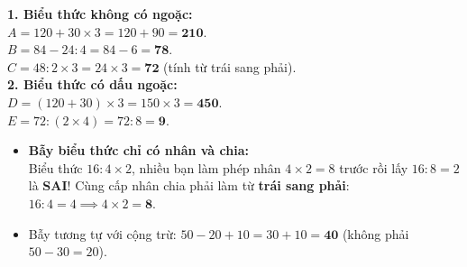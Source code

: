 \documentclass[11pt,a4paper]{article}
\begin{document}
\vspace{-2.5mm}
\noindent
\begin{minipage}[t]{0.49\textwidth}\vspace{0pt}
\begin{tcolorbox}[
  enhanced,
  colback=green!4!white,
  colframe=green!60!black,
  arc=2mm, boxrule=0.8pt,
  left=2mm, right=2mm, top=1.8mm, bottom=1.8mm,
  title={\footnotesize\bfseries\color{white}\faCheckCircle\ Ví dụ thực hành chuẩn mực}
]
{\footnotesize
\textbf{1. Biểu thức không có ngoặc:}\\
$A = 120 + 30 \times 3 = 120 + 90 = \mathbf{210}$.\\
$B = 84 - 24 : 4 = 84 - 6 = \mathbf{78}$.\\
$C = 48 : 2 \times 3 = 24 \times 3 = \mathbf{72}$ (tính từ trái sang phải).\\
\textbf{2. Biểu thức có dấu ngoặc:}\\
$D = (120 + 30) \times 3 = 150 \times 3 = \mathbf{450}$.\\
$E = 72 : (2 \times 4) = 72 : 8 = \mathbf{9}$.
}
\end{tcolorbox}
\end{minipage}
\hfill
\begin{minipage}[t]{0.49\textwidth}\vspace{0pt}
\begin{tcolorbox}[
  enhanced,
  colback=red!4!white,
  colframe=red!70!black,
  arc=2mm, boxrule=0.8pt,
  left=2mm, right=2mm, top=1.8mm, bottom=1.8mm,
  title={\footnotesize\bfseries\color{white}\faExclamationTriangle\ Mẹo tránh bẫy trắc nghiệm}
]
{\footnotesize
\begin{itemize}\setlength{\itemsep}{1.5pt}\setlength{\leftskip}{-2.5mm}
  \item \textbf{Bẫy biểu thức chỉ có nhân và chia:}\\
  Biểu thức $16 : 4 \times 2$, nhiều bạn làm phép nhân $4 \times 2 = 8$ trước rồi lấy $16 : 8 = 2$ là \textbf{SAI}! Cùng cấp nhân chia phải làm từ \textbf{trái sang phải}: $16 : 4 = 4 \implies 4 \times 2 = \mathbf{8}$.
  \item Bẫy tương tự với cộng trừ: $50 - 20 + 10 = 30 + 10 = \mathbf{40}$ (không phải $50 - 30 = 20$).
\end{itemize}
}
\end{tcolorbox}
\end{minipage}
\end{document}
